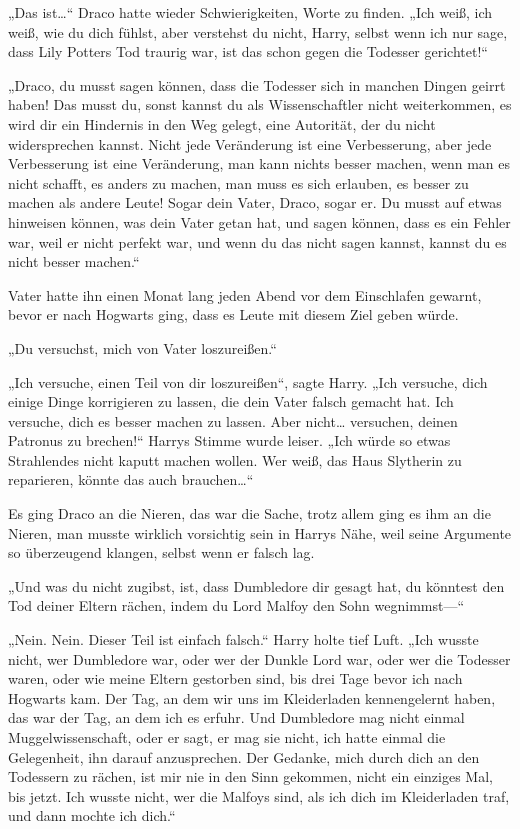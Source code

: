 {„Das ist…“ Draco hatte wieder Schwierigkeiten, Worte zu finden. „Ich weiß, ich weiß, wie du dich fühlst, aber verstehst du nicht, Harry, selbst wenn ich nur sage, dass Lily Potters Tod traurig war, ist das schon gegen die Todesser gerichtet!“

„Draco, du musst sagen können, dass die Todesser sich in manchen Dingen geirrt haben! Das musst du, sonst kannst du als Wissenschaftler nicht weiterkommen, es wird dir ein Hindernis in den Weg gelegt, eine Autorität, der du nicht widersprechen kannst. Nicht jede Veränderung ist eine Verbesserung, aber jede Verbesserung ist eine Veränderung, man kann nichts besser machen, wenn man es nicht schafft, es anders zu machen, man muss es sich erlauben, es besser zu machen als andere Leute! Sogar dein Vater, Draco, sogar er. Du musst auf etwas hinweisen können, was dein Vater getan hat, und sagen können, dass es ein Fehler war, weil er nicht perfekt war, und wenn du das nicht sagen kannst, kannst du es nicht besser machen.“

Vater hatte ihn einen Monat lang jeden Abend vor dem Einschlafen gewarnt, bevor er nach Hogwarts ging, dass es Leute mit diesem Ziel geben würde.

„Du versuchst, mich von Vater loszureißen.“

„Ich versuche, einen Teil von dir loszureißen“, sagte Harry. „Ich versuche, dich einige Dinge korrigieren zu lassen, die dein Vater falsch gemacht hat. Ich versuche, dich es besser machen zu lassen. Aber nicht… versuchen, deinen Patronus zu brechen!“ Harrys Stimme wurde leiser. „Ich würde so etwas Strahlendes nicht kaputt machen wollen. Wer weiß, das Haus Slytherin zu reparieren, könnte das auch brauchen…“

Es ging Draco an die Nieren, das war die Sache, trotz allem ging es ihm an die Nieren, man musste wirklich vorsichtig sein in Harrys Nähe, weil seine Argumente so überzeugend klangen, selbst wenn er falsch lag.

„Und was du nicht zugibst, ist, dass Dumbledore dir gesagt hat, du könntest den Tod deiner Eltern rächen, indem du Lord Malfoy den Sohn wegnimmst—“

„Nein. Nein. Dieser Teil ist einfach falsch.“ Harry holte tief Luft. „Ich wusste nicht, wer Dumbledore war, oder wer der Dunkle Lord war, oder wer die Todesser waren, oder wie meine Eltern gestorben sind, bis drei Tage bevor ich nach Hogwarts kam. Der Tag, an dem wir uns im Kleiderladen kennengelernt haben, das war der Tag, an dem ich es erfuhr. Und Dumbledore mag nicht einmal Muggelwissenschaft, oder er sagt, er mag sie nicht, ich hatte einmal die Gelegenheit, ihn darauf anzusprechen. Der Gedanke, mich durch dich an den Todessern zu rächen, ist mir nie in den Sinn gekommen, nicht ein einziges Mal, bis jetzt. Ich wusste nicht, wer die Malfoys sind, als ich dich im Kleiderladen traf, und dann mochte ich dich.“

}
